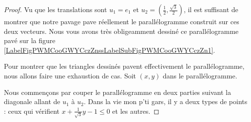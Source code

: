 \begin{proof}
    Vu que les translations sont \( u_1=e_1\) et \( u_2=(\frac{ 1 }{2}, \frac{ \sqrt{ 3 } }{2})\), il est suffisant de montrer que notre pavage pave réellement le parallélogramme construit sur ces deux vecteurs. Nous vous avons très obligeamment dessiné ce parallélogramme pavé sur la figure  \ref{LabelFigPWMCooGWYCczZnssLabelSubFigPWMCooGWYCczZn1}.

    Pour montrer que les triangles dessinés pavent effectivement le parallélogramme, nous allons faire une exhaustion de cas. Soit \( (x,y)\) dans le parallélogramme. 
    
    Nous commençons par couper le parallélogramme en deux parties suivant la diagonale allant de \( u_1\) à \( u_2\). Dans la vie mon p'ti gars, il y a deux types de points : ceux qui vérifient \( x+\frac{1}{ \sqrt{ 3 }}y-1\leq 0\) et les autres.


\end{proof}
